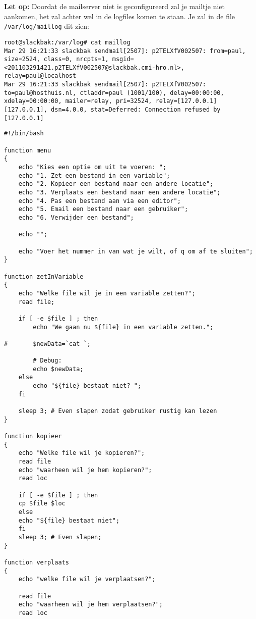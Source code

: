 \textbf{Let op:} Doordat de mailserver niet is geconfigureerd zal je mailtje niet aankomen, het zal achter wel in de logfiles komen te staan. Je zal in de file \texttt{/var/log/maillog} dit zien:
\begin{lstlisting}
root@slackbak:/var/log# cat maillog
Mar 29 16:21:33 slackbak sendmail[2507]: p2TELXfV002507: from=paul, size=2524, class=0, nrcpts=1, msgid=<201103291421.p2TELXfV002507@slackbak.cmi-hro.nl>, relay=paul@localhost
Mar 29 16:21:33 slackbak sendmail[2507]: p2TELXfV002507: to=paul@hosthuis.nl, ctladdr=paul (1001/100), delay=00:00:00, xdelay=00:00:00, mailer=relay, pri=32524, relay=[127.0.0.1] [127.0.0.1], dsn=4.0.0, stat=Deferred: Connection refused by [127.0.0.1]
\end{lstlisting}

\begin{solution}
\begin{lstlisting}
#!/bin/bash

function menu
{
	echo "Kies een optie om uit te voeren: ";
	echo "1. Zet een bestand in een variable";
	echo "2. Kopieer een bestand naar een andere locatie";
	echo "3. Verplaats een bestand naar een andere locatie";
	echo "4. Pas een bestand aan via een editor";
	echo "5. Email een bestand naar een gebruiker";
	echo "6. Verwijder een bestand";
	
	echo "";
	
	echo "Voer het nummer in van wat je wilt, of q om af te sluiten";
}

function zetInVariable
{
	echo "Welke file wil je in een variable zetten?";
	read file;

	if [ -e $file ] ; then
		echo "We gaan nu ${file} in een variable zetten.";

#		$newData=`cat `;

		# Debug:
		echo $newData;
	else
		echo "${file} bestaat niet? ";
	fi

	sleep 3; # Even slapen zodat gebruiker rustig kan lezen
}

function kopieer
{
    echo "Welke file wil je kopieren?";
    read file
    echo "waarheen wil je hem kopieren?";
    read loc

    if [ -e $file ] ; then
	cp $file $loc
    else
	echo "${file} bestaat niet";
    fi
    sleep 3; # Even slapen;
}

function verplaats
{
    echo "welke file wil je verplaatsen?";

    read file
    echo "waarheen wil je hem verplaatsen?";
    read loc


\end{lstlisting}
\end{solution}
